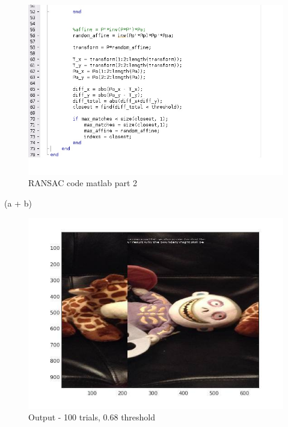 \documentclass[]{article}
\begin{document}
\begin{figure}[h!]
\centering
\includegraphics[width=1.35\textwidth]{img/ransac2.jpg}
\caption{RANSAC code matlab part 2}
\end{figure}

(a + b)
\begin{figure}[h!]
\centering
\includegraphics[width=1.35\textwidth]{img/shredded.jpg}
\caption{Output - 100 trials, 0.68 threshold}
\end{figure}
\end{document}
